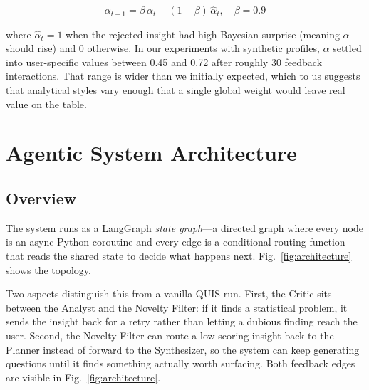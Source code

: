 \documentclass[conference]{IEEEtran}
\begin{document}
\begin{equation}
  \alpha_{t+1} = \beta\,\alpha_t + (1 - \beta)\,\hat{\alpha}_t,
  \quad \beta = 0.9
  \label{eq:alpha_update}
\end{equation}

where $\hat{\alpha}_t = 1$ when the rejected insight had high
Bayesian surprise (meaning $\alpha$ should rise) and 0 otherwise.
In our experiments with synthetic profiles, $\alpha$ settled into
user-specific values between 0.45 and 0.72 after roughly
30 feedback interactions. That range is wider than we initially
expected, which to us suggests that analytical styles vary enough
that a single global weight would leave real value on the table.

\section{Agentic System Architecture}
\label{sec:arch}

\subsection{Overview}

The system runs as a LangGraph \emph{state graph}---a directed graph
where every node is an async Python coroutine and every edge is a
conditional routing function that reads the shared state to decide
what happens next. Fig.~\ref{fig:architecture} shows the topology.

Two aspects distinguish this from a vanilla QUIS run. First, the
Critic sits between the Analyst and the Novelty Filter: if it finds
a statistical problem, it sends the insight back for a retry rather
than letting a dubious finding reach the user. Second, the Novelty
Filter can route a low-scoring insight back to the Planner instead
of forward to the Synthesizer, so the system can keep generating
questions until it finds something actually worth surfacing. Both
feedback edges are visible in Fig.~\ref{fig:architecture}.
\end{document}
